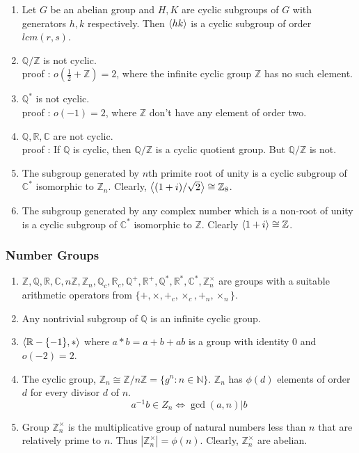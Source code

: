 \begin{enumerate}
	\item Let $G$ be an abelian group and $H,K$ are cyclic subgroups of $G$ with generators $h,k$ respectively. Then $\left\langle hk \right\rangle$ is a cyclic subgroup of order $lcm(r,s)$.
	\item $\mathbb{Q}/\mathbb{Z}$ is not cyclic.\\
		proof : $o(\frac{1}{2} + \mathbb{Z}) = 2$, where the infinite cyclic group $\mathbb{Z}$ has no such element.
	\item $\mathbb{Q}^\ast$ is not cyclic.\\
		proof : $o(-1) = 2$, where $\mathbb{Z}$ don't have any element of order two.
	\item $\mathbb{Q},\mathbb{R},\mathbb{C}$ are not cyclic.\\
		proof : If $\mathbb{Q}$ is cyclic, then $\mathbb{Q}/\mathbb{Z}$ is a cyclic quotient group. But $\mathbb{Q}/\mathbb{Z}$ is not.
	\item The subgroup generated by $n$th primite root of unity is a cyclic subgroup of $\mathbb{C}^\ast$ isomorphic to $\mathbb{Z}_n$.
		Clearly, $\left\langle (1+i)/\sqrt{2} \right\rangle \cong \mathbb{Z}_8$.
	\item The subgroup generated by any complex number which is a non-root of unity is a cyclic subgroup of $\mathbb{C}^\ast$ isomorphic to $\mathbb{Z}$.
		Clearly $\left\langle 1+i \right\rangle \cong \mathbb{Z}$.
\end{enumerate}

\subsubsection{Number Groups}
\begin{enumerate}
	\item $\mathbb{Z},\mathbb{Q},\mathbb{R},\mathbb{C}, n\mathbb{Z}, \mathbb{Z}_n, \mathbb{Q}_c, \mathbb{R}_c, \mathbb{Q}^+, \mathbb{R}^+, \mathbb{Q}^\ast, \mathbb{R}^\ast, \mathbb{C}^\ast, \mathbb{Z}_n^\times$ are groups with a suitable arithmetic operators from $\{ +,\times,+_c,\times_c,+_n,\times_n\}$.
	\item Any nontrivial subgroup of $\mathbb{Q}$ is an infinite cyclic group.
	\item $\left\langle \mathbb{R}-\{-1\},\ast \right\rangle$ where $a \ast b = a+b+ab$ is a group with identity $0$ and $o(-2)=2$.
	\item The cyclic group, $\mathbb{Z}_n \cong \mathbb{Z}/n\mathbb{Z} = \{ g^n : n \in \mathbb{N}\}$. $\mathbb{Z}_n$ has $\phi(d)$ elements of order $d$ for every divisor $d$ of $n$.
	$$a^{-1}b \in Z_n \iff \gcd(a,n)|b$$
	\item Group $\mathbb{Z}_n^\times$ is the multiplicative group of natural numbers less than $n$ that are relatively prime to $n$. Thus $|\mathbb{Z}_n^\times| = \phi(n)$.
	Clearly, $\mathbb{Z}_n^\times$ are abelian.
\end{enumerate}

